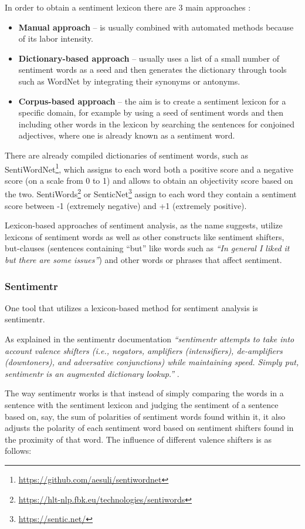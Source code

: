   
  In order to obtain a sentiment lexicon there are 3 main approaches \cite{liu_2015}:
  \begin{itemize}
      \item \textbf{Manual approach} -- is usually combined with automated methods because of its labor intensity.
      \item \textbf{Dictionary-based approach} -- usually uses a list of a small number of sentiment words as a seed and then generates the dictionary through tools such as WordNet \cite{wordnet} by integrating their synonyms or antonyms.
      \item \textbf{Corpus-based approach} -- the aim is to create a sentiment lexicon for a specific domain, for example by using a seed of sentiment words and then including other words in the lexicon by searching the sentences for conjoined adjectives, where one is already known as a sentiment word.
  \end{itemize}
  There are already compiled dictionaries of sentiment words, such as SentiWordNet\footnote{\url{https://github.com/aesuli/sentiwordnet}}, which assigns to each word both a positive score and a negative score (on a scale from 0 to 1) and allows to obtain an objectivity score based on the two. SentiWords\footnote{\url{https://hlt-nlp.fbk.eu/technologies/sentiwords}} or SenticNet\footnote{\url{https://sentic.net/}} assign to each word they contain a sentiment score between -1 (extremely negative) and +1 (extremely positive).
  
Lexicon-based approaches of sentiment analysis, as the name suggests, utilize lexicons of sentiment words as well as other constructs like sentiment shifters, but-clauses (sentences containing ``but'' like words such as \textit{``In general I liked it but there are some issues''}) and other words or phrases that affect sentiment.
\subsubsection{Sentimentr}
\label{sec:sentimentr}
One tool that utilizes a lexicon-based method for sentiment analysis is sentimentr.

 As explained in the sentimentr documentation \textit{``sentimentr attempts to take into account valence shifters (i.e., negators, amplifiers (intensifiers), de-amplifiers (downtoners), and adversative conjunctions) while maintaining speed. Simply put, sentimentr is an augmented dictionary lookup.''} \cite{sentimentr}.
 
The way sentimentr works is that instead of simply comparing the words in a sentence with the sentiment lexicon and judging the sentiment of a sentence based on, say, the sum of polarities of sentiment words found within it, it also adjusts the polarity of each sentiment word based on sentiment shifters found in the proximity of that word. The influence of different valence shifters is as follows:


